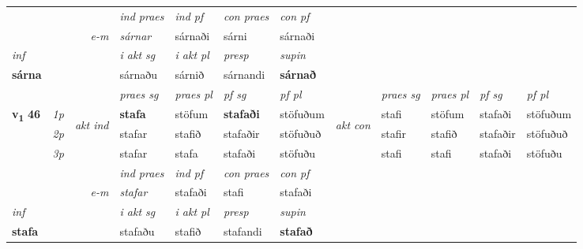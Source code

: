 \begin{longtable}[l]{X>{\footnotesize\itshape}llXXXXlXXXX}
   && &  \textit{ind praes} & \textit{ind pf} & \textit{con praes} & \textit{con pf} \\*
\multicolumn{3}{r}{\textit{e-m}} & sárnar & sárnaði & sárni & sárnaði \\*

\cmidrule{4-7}
   {\textit{inf}} & &  & \textit{i akt sg} & \textit{i akt pl}   & \textit{presp} & \textit{supin}   \\*
  {\textbf{sárna}} & && sárnaðu  & sárnið   & sárnandi &  \textbf{sárnað}   \\*

\midrule

 & &   & \textit{praes sg}  & \textit{praes pl}    & \textit{ pf sg} & \textit{pf pl} & & \textit{praes sg}  & \textit{praes pl}    & \textit{pf sg} & \textit{pf pl }  \\ \cmidrule{4-7} \cmidrule{9-12}
 \multirow{2}{*}{{{\textbf{v{\textsubscript{1}}} \Large{\textbf{46}}}}}  & 1p & \multirow{3}{*}{\begin{turn}{90}\textit{akt ind}\end{turn}} & \textbf{stafa} & stöfum & \textbf{stafaði} & stöfuðum & \multirow{3}{*}{\begin{turn}{90}\textit{akt con}\end{turn}} &stafi & stöfum & stafaði & stöfuðum\\*
 & 2p &  &  stafar  & stafið & stafaðir & stöfuðuð & & stafir & stafið & stafaðir & stöfuðuð \\*
 & 3p &  & stafar & stafa & stafaði & stöfuðu & & stafi & stafi& stafaði & stöfuðu \\*
\cmidrule{4-7} \cmidrule{9-12}

   && &  \textit{ind praes} & \textit{ind pf} & \textit{con praes} & \textit{con pf} \\*
\multicolumn{3}{r}{\textit{e-m}} & stafar & stafaði & stafi & stafaði \\*

\cmidrule{4-7}
   {\textit{inf}} & &  & \textit{i akt sg} & \textit{i akt pl}   & \textit{presp} & \textit{supin}   \\*
  {\textbf{stafa}} & && stafaðu  & stafið   & stafandi &  \textbf{stafað}   \\*

\midrule


\end{longtable}
